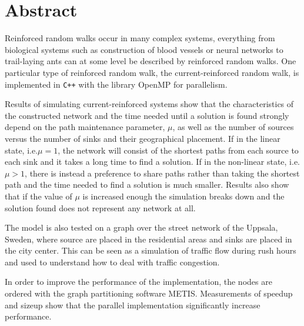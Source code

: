 \section*{Abstract}
\label{sec:abstract}

Reinforced random walks occur in many complex systems, everything from biological systems such as construction of blood vessels or neural networks to trail-laying ants can at some level be described by reinforced random walks. One particular type of reinforced random walk, the current-reinforced random walk, is implemented in \texttt{C++} with the library OpenMP for parallelism.

Results of simulating current-reinforced systems show that the characteristics of the constructed network and the time needed until a solution is found strongly depend on the path maintenance parameter, $\mu$, as well as the number of sources versus the number of sinks and their geographical placement. If in the linear state, i.e.\@ $\mu = 1$, the network will consist of the shortest paths from each source to each sink and it takes a long time to find a solution. If in the non-linear state, i.e.\@ $\mu > 1$, there is instead a preference to share paths rather than taking the shortest path and the time needed to find a solution is much smaller. Results also show that if the value of $\mu$ is increased enough the simulation breaks down and the solution found does not represent any network at all. 

The model is also tested on a graph over the street network of the Uppsala, Sweden, where source are placed in the residential areas and sinks are placed in the city center. This can be seen as a simulation of traffic flow during rush hours and used to understand how to deal with traffic congestion.

In order to improve the performance of the implementation, the nodes are ordered with the graph partitioning software METIS. Measurements of speedup and sizeup show that the parallel implementation significantly increase performance. 
